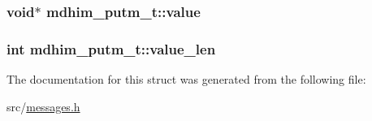 \hypertarget{structmdhim__putm__t_adac45376bec0e989940d3a2b4a374daf}{
\subsubsection[{value}]{\setlength{\rightskip}{0pt plus 5cm}void$\ast$ mdhim\-\_\-putm\-\_\-t\-::value}}\label{d6/dcd/structmdhim__putm__t_adac45376bec0e989940d3a2b4a374daf}
\hypertarget{structmdhim__putm__t_af8cba256ae6e9003d55bc640c41f41e1}{
\subsubsection[{value\-\_\-len}]{\setlength{\rightskip}{0pt plus 5cm}int mdhim\-\_\-putm\-\_\-t\-::value\-\_\-len}}\label{d6/dcd/structmdhim__putm__t_af8cba256ae6e9003d55bc640c41f41e1}


The documentation for this struct was generated from the following file\-:\begin{DoxyCompactItemize}
\item 
src/\hyperlink{messages_8h}{messages.\-h}\end{DoxyCompactItemize}

